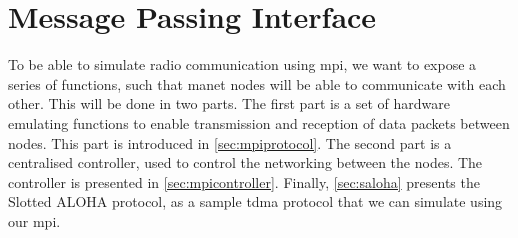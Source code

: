 \chapter{Message Passing Interface}

To be able to simulate radio communication using \gls{mpi}, we want to expose a series of functions, such that \gls{manet} nodes will be able to communicate with each other. This will be done in two parts. The first part is a set of hardware emulating functions to enable transmission and reception of data packets between nodes. This part is introduced in \autoref{sec:mpiprotocol}. The second part is a centralised controller, used to control the networking between the nodes. The controller is presented in \autoref{sec:mpicontroller}. Finally, \autoref{sec:saloha} presents the Slotted ALOHA protocol, as a sample \gls{tdma} protocol that we can simulate using our \gls{mpi}.




